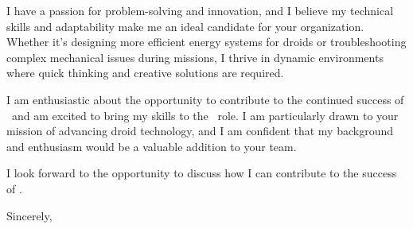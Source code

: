 \documentclass[10pt, a4paper]{article}
\begin{document}
I have a passion for problem-solving and innovation, and I believe my technical skills and adaptability make me an ideal candidate for your organization. Whether it’s designing more efficient energy systems for droids or troubleshooting complex mechanical issues during missions, I thrive in dynamic environments where quick thinking and creative solutions are required.

I am enthusiastic about the opportunity to contribute to the continued success of \COMPANY\ and am excited to bring my skills to the \ROLE\ role. I am particularly drawn to your mission of advancing droid technology, and I am confident that my background and enthusiasm would be a valuable addition to your team.

I look forward to the opportunity to discuss how I can contribute to the success of \COMPANY.

\bigskip

Sincerely,

\vspace{20pt}

\name
\end{document}
